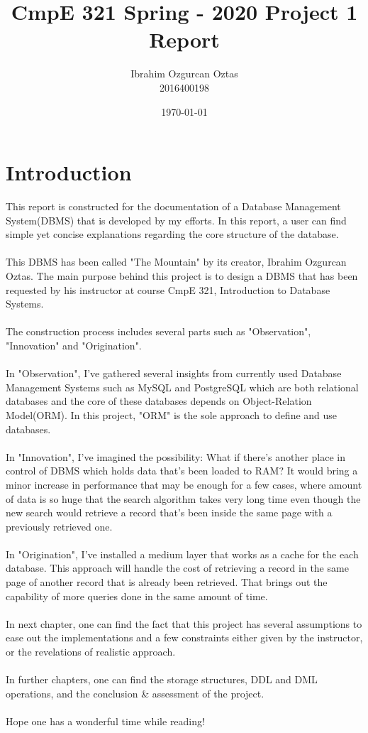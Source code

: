 \documentclass[12pt]{report}
\title{\bf{CmpE 321 Spring - 2020 Project 1 Report}}
\author{Ibrahim Ozgurcan Oztas \\ 2016400198}
\date{\today}
\begin{document}
\maketitle
{}
\newpage
\tableofcontents

\chapter{Introduction}
This report is constructed for the documentation of a Database Management System(DBMS) that is developed by my efforts. In this report, a user can find simple yet concise explanations regarding the core structure of the database. \\\\
This DBMS has been called "The Mountain" by its creator, Ibrahim Ozgurcan Oztas. The main purpose behind this project is to design a DBMS that has been requested by his instructor at course CmpE 321, Introduction to Database Systems. \\\\
The construction process includes several parts such as "Observation", "Innovation" and "Origination". \\\\
In "Observation", I've gathered several insights from currently used Database Management Systems such as MySQL and PostgreSQL which are both relational databases and the core of these databases depends on Object-Relation Model(ORM). In this project, "ORM" is the sole approach to define and use databases. \\\\
In "Innovation", I've imagined the possibility: What if there's another place in control of DBMS which holds data that's been loaded to RAM? It would bring a minor increase in performance that may be enough for a few cases, where amount of data is so huge that the search algorithm takes very long time even though the new search would retrieve a record that's been inside the same page with a previously retrieved one. \\\\
In "Origination", I've installed a medium layer that works as a cache for the each database. This approach will handle the cost of retrieving a record in the same page of another record that is already been retrieved. That brings out the capability of more queries done in the same amount of time. \\\\
In next chapter, one can find the fact that this project has several assumptions to ease out the implementations and a few constraints either given by the instructor, or the revelations of realistic approach. \\\\ 
In further chapters, one can find the storage structures, DDL and DML operations, and the conclusion \& assessment of the project. \\\\
Hope one has a wonderful time while reading!
\end{document}
